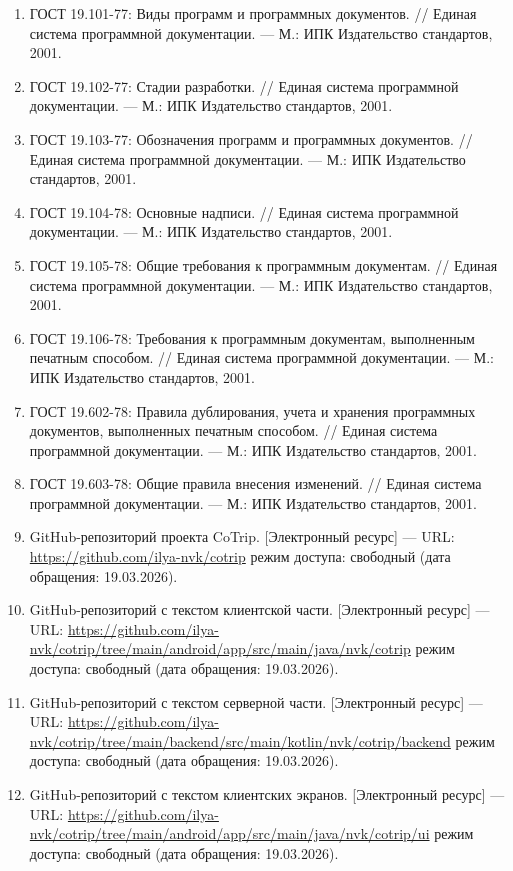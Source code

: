 \documentclass[12pt,a4paper]{article}
\begin{document}
\begin{enumerate}
  \item ГОСТ 19.101-77: Виды программ и программных документов. // Единая система программной документации. --- М.: ИПК Издательство стандартов, 2001.
  \item ГОСТ 19.102-77: Стадии разработки. // Единая система программной документации. --- М.: ИПК Издательство стандартов, 2001.
  \item ГОСТ 19.103-77: Обозначения программ и программных документов. // Единая система программной документации. --- М.: ИПК Издательство стандартов, 2001.
  \item ГОСТ 19.104-78: Основные надписи. // Единая система программной документации. --- М.: ИПК Издательство стандартов, 2001.
  \item ГОСТ 19.105-78: Общие требования к программным документам. // Единая система программной документации. --- М.: ИПК Издательство стандартов, 2001.
  \item ГОСТ 19.106-78: Требования к программным документам, выполненным печатным способом. // Единая система программной документации. --- М.: ИПК Издательство стандартов, 2001.
  \item ГОСТ 19.602-78: Правила дублирования, учета и хранения программных документов, выполненных печатным способом. // Единая система программной документации. --- М.: ИПК Издательство стандартов, 2001.
  \item ГОСТ 19.603-78: Общие правила внесения изменений. // Единая система программной документации. --- М.: ИПК Издательство стандартов, 2001.
  \item GitHub-репозиторий проекта CoTrip. [Электронный ресурс] --- URL: \url{https://github.com/ilya-nvk/cotrip} режим доступа: свободный (дата обращения: 19.03.2026).
  \item GitHub-репозиторий с текстом клиентской части. [Электронный ресурс] --- URL: \url{https://github.com/ilya-nvk/cotrip/tree/main/android/app/src/main/java/nvk/cotrip} режим доступа: свободный (дата обращения: 19.03.2026).
  \item GitHub-репозиторий с текстом серверной части. [Электронный ресурс] --- URL: \url{https://github.com/ilya-nvk/cotrip/tree/main/backend/src/main/kotlin/nvk/cotrip/backend} режим доступа: свободный (дата обращения: 19.03.2026).
  \item GitHub-репозиторий с текстом клиентских экранов. [Электронный ресурс] --- URL: \url{https://github.com/ilya-nvk/cotrip/tree/main/android/app/src/main/java/nvk/cotrip/ui} режим доступа: свободный (дата обращения: 19.03.2026).

\end{enumerate}
\end{document}
